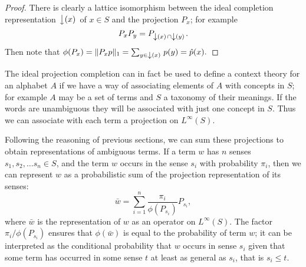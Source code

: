 \begin{proof} There is clearly a lattice isomorphism between the ideal completion representation $\left\downarrow(x)\right.$ of $x\in S$ and the projection $P_x$; for example
$$P_xP_y = P_{\left\downarrow(x)\right.\cap\left\downarrow(y)\right.}.$$
Then note that
$\phi(P_x) = \|P_xp\|_1 = \sum_{y \in \left\downarrow(x)\right.}p(y) = \hat{p}(x).$
\end{proof}


The ideal projection completion can in fact be used to define a context theory for an alphabet $A$ if we have a way of associating elements of $A$ with concepts in $S$; for example $A$ may be a set of terms and $S$ a taxonomy of their meanings. If the words are unambiguous they will be associated with just one concept in $S$. Thus we can associate with each term a projection on $L^\infty(S)$.

Following the reasoning of previous sections, we can sum these projections to obtain representations of ambiguous terms. If a term $w$ has $n$ senses $s_1, s_2, \ldots s_n \in S$, and the term $w$ occurs in the sense $s_i$ with probability $\pi_i$, then we can represent $w$ as a probabilistic sum of the projection representation of its senses:
$$\bar{w} = \sum_{i = 1}^n \frac{\pi_i}{\phi(P_{s_i})} P_{s_i},$$
where $\bar{w}$ is the representation of $w$ as an operator on $L^\infty(S)$. The factor $\pi_i/\phi(P_{s_i})$ ensures that $\phi(\bar{w})$ is equal to the probability of term $w$; it can be interpreted as the conditional probability that $w$ occurs in sense $s_i$ given that some term has occurred in some sense $t$ at least as general as $s_i$, that is $s_i \le t$.

